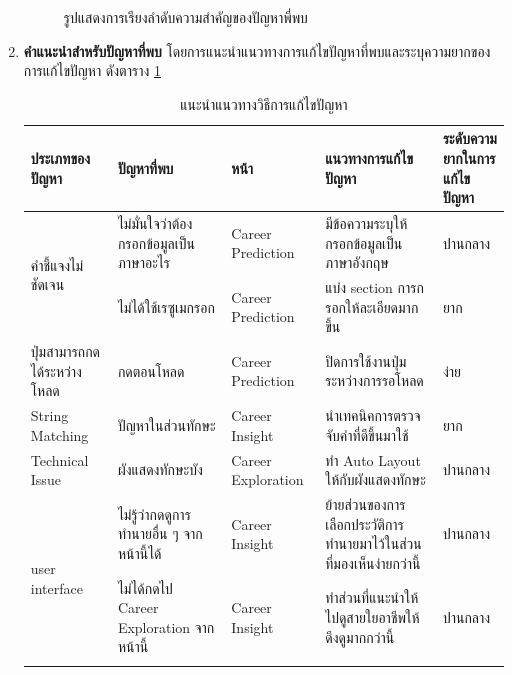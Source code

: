 \begin{enumerate}
\begin{figure}[H]
              \caption{รูปแสดงการเรียงลำดับความสำคัญของปัญหาพี่พบ}\label{fig:PrioritizeUT}
          \end{figure}
    \item \textbf{คำแนะนำสำหรับปัญหาที่พบ} โดยการแนะนำแนวทางการแก้ไขปัญหาที่พบและระบุความยากของการแก้ไขปัญหา ดังตาราง \ref{tab:recommendationsUT}
          \begin{table}[H]
              \caption{แนะนำแนวทางวิธีการแก้ไขปัญหา}
              \label{tab:recommendationsUT}
              \begin{tabularx}{\textwidth}{|l|>{\raggedright\arraybackslash}X|l|>{\raggedright\arraybackslash}X|>{\raggedright\arraybackslash}X|}
                  \hline
                  \textbf{ประเภทของปัญหา}             & \textbf{ปัญหาที่พบ}                    & \textbf{หน้า}       & \textbf{แนวทางการแก้ไขปัญหา}                          & \textbf{ระดับความยากในการแก้ไขปัญหา} \\ \hline
                  \multirow[t]{2}{*}{คำชี้แจงไม่ชัดเจน}   & ไม่มั่นใจว่าต้องกรอกข้อมูลเป็นภาษาอะไร      & Career Prediction  & มีข้อความระบุให้กรอกข้อมูลเป็นภาษาอังกฤษ                    & ปานกลาง                           \\ \cline{2-5}
                                                     & ไม่ได้ใช้เรซูเมกรอก                     & Career Prediction  & แบ่ง section การกรอกให้ละเอียดมากขึ้น                    & ยาก                               \\ \hline
                  ปุ่มสามารถกดได้ระหว่างโหลด             & กดตอนโหลด                           & Career Prediction  & ปิดการใช้งานปุ่มระหว่างการรอโหลด                         & ง่าย                               \\ \hline
                  String Matching                    & ปัญหาในส่วนทักษะ                       & Career Insight     & นำเทคนิคการตรวจจับคำที่ดีขึ้นมาใช้                            & ยาก                               \\ \hline
                  Technical Issue                    & ผังแสดงทักษะบัง                              & Career Exploration & ทำ Auto Layout ให้กับผังแสดงทักษะ                              & ปานกลาง                           \\ \hline
                  \multirow[t]{3}{*}{user interface} & ไม่รู้ว่ากดดูการทำนายอื่น ๆ จากหน้านี้ได้       & Career Insight     & ย้ายส่วนของการเลือกประวัติการทำนายมาไว้ในส่วนที่มองเห็นง่ายกว่านี้ & ปานกลาง                           \\ \cline{2-5}
                                                     & ไม่ได้กดไป Career Exploration จากหน้านี้ & Career Insight     & ทำส่วนที่แนะนำให้ไปดูสายใยอาชีพให้ดึงดูมากกว่านี้                 & ปานกลาง                           \\ \cline{2-5}

\end{tabularx}
\end{table}
\end{enumerate}
